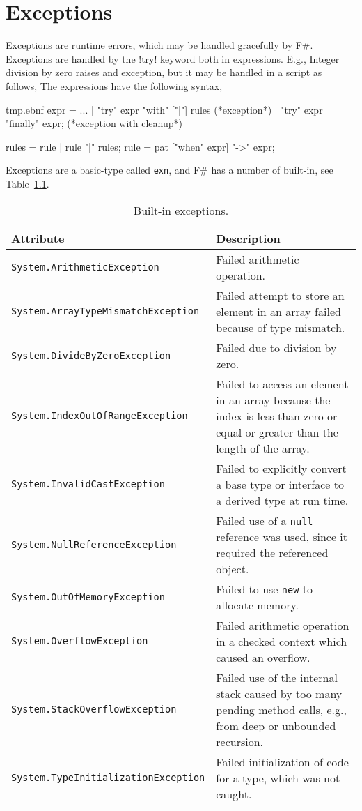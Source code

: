 \chapter{Exceptions}
\label{chap:exceptions}
Exceptions are runtime errors, which may be handled gracefully by F\#. Exceptions are handled by the \keyword!try! keyword both in expressions. E.g., Integer division by zero raises and exception, but it may be handled in a script as follows,
%
%
The  expressions have the following syntax,
%
\begin{verbatimwrite}{tmp.ebnf}
expr = ... 
  | "try" expr "with" ["|"] rules (*exception*)
  | "try" expr "finally" expr; (*exception with cleanup*)

rules = rule | rule "|" rules;
rule = pat ["when" expr] "->" expr;
\end{verbatimwrite}
%
Exceptions are a basic-type called \lstinline!exn!, and F\# has a number of built-in, see Table~\ref{tab:exceptions}.
\begin{table}
  \centering
  \begin{tabularx}{\linewidth}{|l|X|}
    \hline
    Attribute & Description\\
    \hline
    \lstinline!System.ArithmeticException! & Failed arithmetic operation.\\
   \hline
    \lstinline!System.ArrayTypeMismatchException! & Failed attempt to store an element in an array failed because of type mismatch.\\
   \hline
    \lstinline!System.DivideByZeroException! & Failed due to division by zero.\\
   \hline
    \lstinline!System.IndexOutOfRangeException! & Failed to access an element in an array because the index is less than zero or equal or greater than the length of the array.\\
   \hline
    \lstinline!System.InvalidCastException! & Failed to explicitly convert a base type or interface to a derived type at run time.\\
   \hline
    \lstinline!System.NullReferenceException! & Failed use of a \lstinline!null! reference was used, since it required the referenced object.\\
   \hline
    \lstinline!System.OutOfMemoryException! & Failed to use \lstinline!new! to allocate memory.\\ 
   \hline
    \lstinline!System.OverflowException! & Failed arithmetic operation in a checked context which caused an overflow.\\
   \hline
    \lstinline!System.StackOverflowException ! & Failed use of the internal stack caused by too many pending method calls, e.g., from deep or unbounded recursion.\\
   \hline
    \lstinline!System.TypeInitializationException! & Failed initialization of code for a type, which was not caught.\\
   \hline
  \end{tabularx}
  \caption{Built-in exceptions.}
  \label{tab:exceptions}
\end{table}
